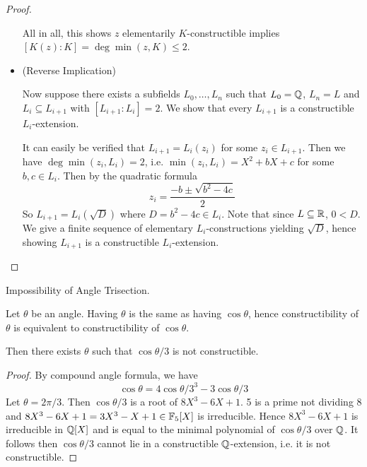 \documentclass[../book.tex]{subfiles}
\begin{document}
\begin{proof}
\begin{itemize}
    All in all, this shows $z$ elementarily $K$-constructible 
    implies $[K(z) : K] = \deg\min(z,K) \leq 2$.
    
    \item (Reverse Implication)
    
    Now suppose there exists a subfields $L_0, \dots, L_n$ such that 
    $L_0 = \mathbb{Q}$, $L_n = L$ and $L_i \subseteq L_{i+1}$ with $[L_{i+1} : L_i] = 2$.
    We show that every $L_{i+1}$ is a constructible $L_i$-extension.
    
    It can easily be verified that $L_{i+1} = L_i(z_i)$ for some $z_i \in L_{i+1}$.
    Then we have $\deg\min(z_i,L_i) = 2$, 
    i.e. $\min(z_i,L_i) = X^2 + bX + c$ for some $b, c \in L_i$. 
    Then by the quadratic formula \[
        z_i = \frac{-b \pm \sqrt{b^2 - 4c}}{2}
    \]
    So $L_{i+1} = L_i(\sqrt{D})$ where $D = b^2 - 4c \in L_i$.
    Note that since $L \subseteq \mathbb{R}$, $0 < D$. 
    We give a finite sequence of elementary $L_i$-constructions yielding $\sqrt{D}$,
    hence showing $L_{i+1}$ is a constructible $L_i$-extension.
    
    
    \end{itemize}
\end{proof}

\begin{cor} Impossibility of Angle Trisection.
    
    Let $\theta$ be an angle. 
    Having $\theta$ is the same as having $\cos{\theta}$,
    hence constructibility of $\theta$ is equivalent to 
    constructibility of $\cos{\theta}$.
    
    Then there exists $\theta$ such that 
    $\cos{\theta / 3}$ is not constructible. 
    
\end{cor}
\begin{proof}
    
    By compound angle formula, we have \[ 
        \cos{\theta} = 4\cos{\theta/3}^3 - 3\cos{\theta/3}
    \]
    Let $\theta = 2\pi / 3$. Then $\cos{\theta/3}$ is a root of $8X^3 - 6X + 1$.
    5 is a prime not dividing 8 and 
    $8X^3 - 6X + 1 = 3X^3 - X + 1 \in \mathbb{F}_5[X]$ is irreducible.
    Hence $8X^3 - 6X + 1$ is irreducible in $\mathbb{Q}[X]$ and is equal to
    the minimal polynomial of $\cos{\theta/3}$ over $\mathbb{Q}$. 
    It follows then $\cos{\theta/3}$ cannot lie in a constructible $\mathbb{Q}$-extension,
    i.e. it is not constructible.
    
\end{proof}
\end{document}
